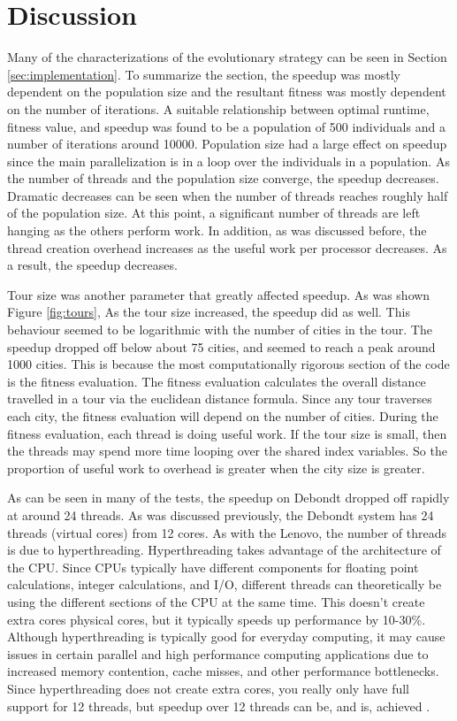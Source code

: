 \documentclass[10pt,letterpaper]{article}
\begin{document}
\newpage
\section{Discussion} \label{sec:discussion}
Many of the characterizations of the evolutionary strategy can be seen in Section \ref{sec:implementation}. To summarize the section, the speedup was mostly dependent on the population size and the resultant fitness was mostly dependent on the number of iterations. A suitable relationship between optimal runtime, fitness value, and speedup was found to be a population of 500 individuals and a number of iterations around 10000. Population size had a large effect on speedup since the main parallelization is in a loop over the individuals in a population. As the number of threads and the population size converge, the speedup decreases. Dramatic decreases can be seen when the number of threads reaches roughly half of the population size. At this point, a significant number of threads are left hanging as the others perform work. In addition, as was discussed before, the thread creation overhead increases as the useful work per processor decreases. As a result, the speedup decreases.

\newpage
Tour size was another parameter that greatly affected speedup. As was shown Figure \ref{fig:tours}, As the tour size increased, the speedup did as well. %
This behaviour seemed to be logarithmic with the number of cities in the tour. The speedup dropped off below about 75 cities, and seemed to reach a peak around 1000 cities. This is because the most computationally rigorous section of the code is the fitness evaluation. The fitness evaluation calculates the overall distance travelled in a tour via the euclidean distance formula. Since any tour traverses each city, the fitness evaluation will depend on the number of cities. During the fitness evaluation, each thread is doing useful work. If the tour size is small, then the threads may spend more time looping over the shared index variables. So the proportion of useful work to overhead is greater when the city size is greater.

As can be seen in many of the tests, the speedup on Debondt dropped off rapidly at around 24 threads. As was discussed previously, the Debondt system has 24 threads (virtual cores) from 12 cores. As with the Lenovo, the number of threads is due to hyperthreading. Hyperthreading takes advantage of the architecture of the CPU. Since CPUs typically have different components for floating point calculations, integer calculations, and I/O, different threads can theoretically be using the different sections of the CPU at the same time. This doesn't create extra cores physical cores, but it typically speeds up performance by 10-30\%. Although hyperthreading is typically good for everyday computing, it may cause issues in certain parallel and high performance computing applications due to increased memory contention, cache misses, and other performance bottlenecks. Since hyperthreading does not create extra cores, you really only have full support for 12 threads, but speedup over 12 threads can be, and is, achieved \cite{leng2002study}.
\end{document}

